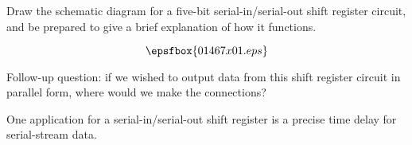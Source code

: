 

Draw the schematic diagram for a five-bit serial-in/serial-out shift register circuit, and be prepared to give a brief explanation of how it functions.







$$\epsfbox{01467x01.eps}$$

\vskip 10pt

Follow-up question: if we wished to output data from this shift register circuit in parallel form, where would we make the connections?







One application for a serial-in/serial-out shift register is a precise time delay for serial-stream data.




